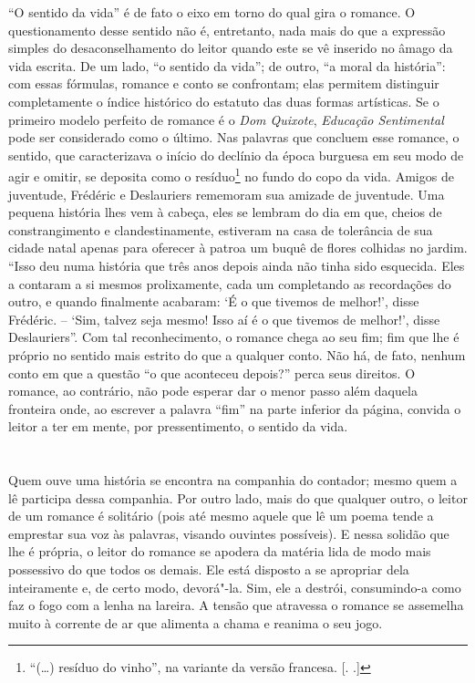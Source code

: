 ``O sentido da vida'' é de fato o eixo em torno do qual gira o romance.
O questionamento desse sentido não é, entretanto, nada mais do que a
expressão simples do desaconselhamento do leitor quando este se vê
inserido no âmago da vida escrita. De um lado, ``o sentido da vida'';
de outro, ``a moral da história'': com essas fórmulas, romance e conto
se confrontam; elas permitem distinguir completamente o índice histórico
do estatuto das duas formas artísticas. Se o primeiro modelo perfeito de
romance é o \emph{Dom Quixote}, \emph{Educação Sentimental} pode ser
considerado como o último. Nas palavras que concluem esse romance, o
sentido, que caracterizava o início do declínio da época burguesa em seu
modo de agir e omitir, se deposita como o resíduo\footnote{``(\ldots{}) resíduo do
  vinho'', na variante da versão francesa. [. .]} no fundo do
copo da vida. Amigos de juventude, Frédéric e Deslauriers rememoram sua
amizade de juventude. Uma pequena história lhes vem à cabeça, eles se
lembram do dia em que, cheios de constrangimento e clandestinamente,
estiveram na casa de tolerância de sua cidade natal apenas para oferecer
à patroa um buquê de flores colhidas no jardim. ``Isso deu numa história
que três anos depois ainda não tinha sido esquecida. Eles a contaram a
si mesmos prolixamente, cada um completando as recordações do outro, e
quando finalmente acabaram: `É o que tivemos de melhor!', disse
Frédéric. -- `Sim, talvez seja mesmo! Isso aí é o que tivemos de
melhor!', disse Deslauriers''. Com tal reconhecimento, o romance chega
ao seu fim; fim que lhe é próprio no sentido mais estrito do que a
qualquer conto. Não há, de fato, nenhum conto em que a questão ``o que
aconteceu depois?'' perca seus direitos. O romance, ao contrário, não
pode esperar dar o menor passo além daquela fronteira onde, ao escrever
a palavra ``fim'' na parte inferior da página, convida o leitor a ter em
mente, por pressentimento, o sentido da vida.

\section{}

Quem ouve uma história se encontra na companhia do contador; mesmo quem
a lê participa dessa companhia. Por outro lado, mais do que qualquer
outro, o leitor de um romance é solitário (pois até mesmo aquele que lê
um poema tende a emprestar sua voz às palavras, visando ouvintes
possíveis). E nessa solidão que lhe é própria, o leitor do romance se
apodera da matéria lida de modo mais possessivo do que todos os demais.
Ele está disposto a se apropriar dela inteiramente e, de certo modo,
devorá"-la. Sim, ele a destrói, consumindo-a como faz o fogo com a lenha
na lareira. A tensão que atravessa o romance se assemelha muito à
corrente de ar que alimenta a chama e reanima o seu jogo.


